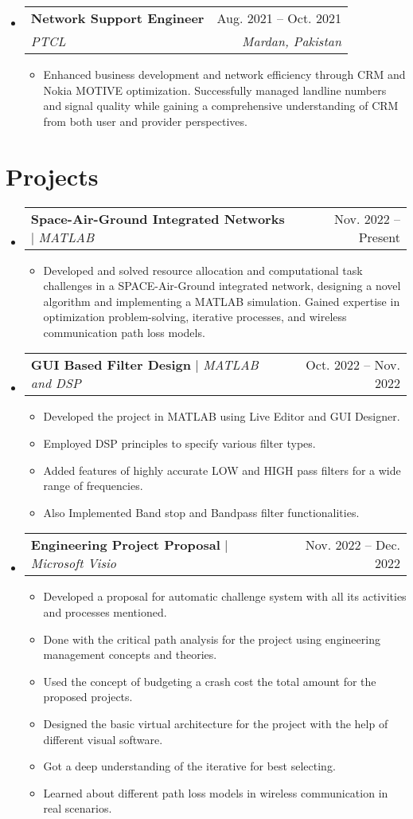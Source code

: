 \documentclass[letterpaper,11pt]{article}
\makeatletter
\newcommand{\resumeItem}[1]{
  \item\small{
    {#1 \vspace{-2pt}}
  }
}
\newcommand{\resumeSubheading}[4]{
  \vspace{-0.5pt}\item
    \begin{tabular*}{0.97\textwidth}[t]{l@{\extracolsep{\fill}}r}
      \textbf{#1} & #2 \\
      \textit{#3} & \textit{\small #4} \\
    \end{tabular*}\vspace{-7pt}
}
\newcommand{\resumeProjectHeading}[2]{
    \item
    \begin{tabular*}{0.97\textwidth}{l@{\extracolsep{\fill}}r}
      \small#1 & #2 \\
    \end{tabular*}\vspace{-7pt}
}
\newcommand{\resumeSubHeadingListStart}{\begin{itemize}[leftmargin=0.15in, label={}]}
\newcommand{\resumeSubHeadingListEnd}{\end{itemize}}
\newcommand{\resumeItemListStart}{\begin{itemize}}
\newcommand{\resumeItemListEnd}{\end{itemize}\vspace{-7pt}}
\makeatother
\begin{document}
\resumeSubHeadingListStart
    \resumeSubheading
      {Network Support Engineer}{Aug. 2021 -- Oct. 2021}
      {PTCL}{Mardan, Pakistan}
      \resumeItemListStart
        \resumeItem{Enhanced business development and network efficiency through CRM and Nokia MOTIVE optimization. Successfully managed landline numbers and signal quality while gaining a comprehensive understanding of CRM from both user and provider perspectives.}
      \resumeItemListEnd
    \resumeSubHeadingListEnd

\section{Projects}
  \resumeSubHeadingListStart
    \resumeProjectHeading
      {\textbf{Space-Air-Ground Integrated Networks} $|$ \emph{MATLAB}}{Nov. 2022 -- Present}
      \resumeItemListStart
        \resumeItem{Developed and solved resource allocation and computational task challenges in a SPACE-Air-Ground integrated network, designing a novel algorithm and implementing a MATLAB simulation. Gained expertise in optimization problem-solving, iterative processes, and wireless communication path loss models.}
      \resumeItemListEnd
    \resumeSubHeadingListEnd

  \resumeSubHeadingListStart
    \resumeProjectHeading
      {\textbf{GUI Based Filter Design} $|$ \emph{MATLAB and DSP}}{Oct. 2022 -- Nov. 2022}
      \resumeItemListStart
        \resumeItem{Developed the project in MATLAB using Live Editor and GUI Designer.}
        \resumeItem{Employed DSP principles to specify various filter types.}
        \resumeItem{Added features of highly accurate LOW and HIGH pass filters for a wide range of frequencies.}
        \resumeItem{Also Implemented Band stop and Bandpass filter functionalities.}
      \resumeItemListEnd
    \resumeSubHeadingListEnd

  \resumeSubHeadingListStart
    \resumeProjectHeading
      {\textbf{Engineering Project Proposal} $|$ \emph{Microsoft Visio}}{Nov. 2022 -- Dec. 2022}
      \resumeItemListStart
        \resumeItem{Developed a proposal for automatic challenge system with all its activities and processes mentioned.}
        \resumeItem{Done with the critical path analysis for the project using engineering management concepts and theories.}
        \resumeItem{Used the concept of budgeting a crash cost the total amount for the proposed projects.}
        \resumeItem{Designed the basic virtual architecture for the project with the help of different visual software.}
        \resumeItem{Got a deep understanding of the iterative for best selecting.}
        \resumeItem{Learned about different path loss models in wireless communication in real scenarios.}
      \resumeItemListEnd
    \resumeSubHeadingListEnd
\end{document}
